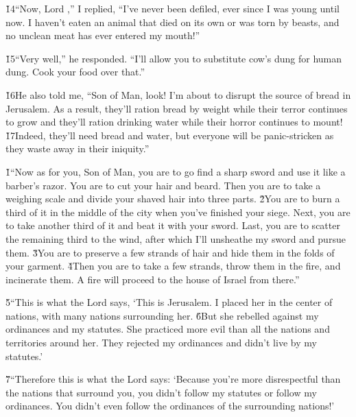 \v{14}``Now, Lord ,'' I replied, ``I've never been defiled, ever since I was young until now. I haven't eaten an animal that died on its own or was torn by beasts, and no unclean meat has ever entered my mouth!''

\v{15}``Very well,'' he responded. ``I'll allow you to substitute cow's dung for human dung. Cook your food over that.''

\v{16}He also told me, ``Son of Man, look! I'm about to disrupt the source of bread in Jerusalem. As a result, they'll ration bread by weight while their terror continues to grow and they'll ration drinking water while their horror continues to mount! \v{17}Indeed, they'll need bread and water, but everyone will be panic-stricken as they waste away in their iniquity.''

\v{1}``Now as for you, Son of Man, you are to go find a sharp sword and use it like a barber's razor. You are to cut your hair and beard. Then you are to take a weighing scale and divide your shaved hair into three parts. \v{2}You are to burn a third of it in the middle of the city when you've finished your siege. Next, you are to take another third of it and beat it with your sword. Last, you are to scatter the remaining third to the wind, after which I'll unsheathe my sword and pursue them. \v{3}You are to preserve a few strands of hair and hide them in the folds of your garment. \v{4}Then you are to take a few strands, throw them in the fire, and incinerate them. A fire will proceed to the house of Israel from there.''

\v{5}``This is what the Lord  says, `This is Jerusalem. I placed her in the center of nations, with many nations surrounding her. \v{6}But she rebelled against my ordinances and my statutes. She practiced more evil than all the nations and territories around her. They rejected my ordinances and didn't live by my statutes.'

\v{7}``Therefore this is what the Lord  says: `Because you're more disrespectful than the nations that surround you, you didn't follow my statutes or follow my ordinances. You didn't even follow the ordinances of the surrounding nations!'


